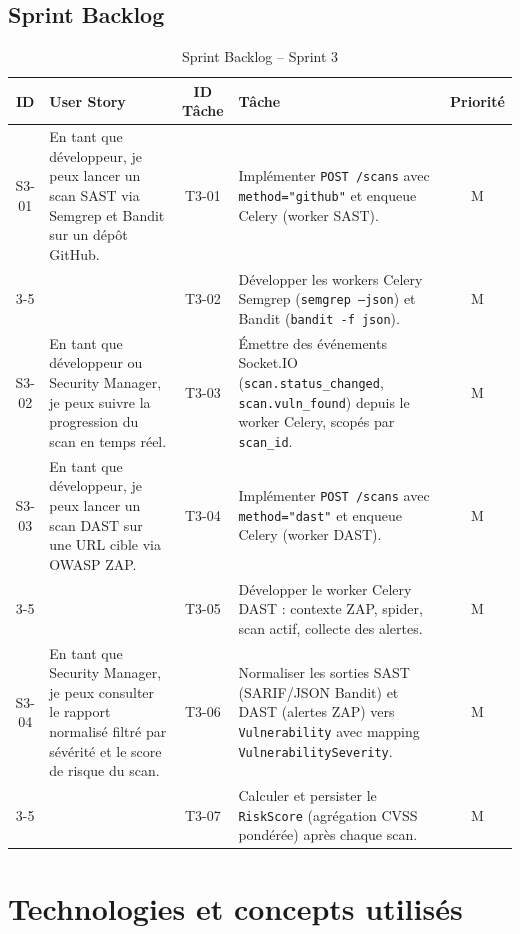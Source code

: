 \subsection{Sprint Backlog}
\begin{table}[H]
\centering
\caption{Sprint Backlog -- Sprint 3}
\label{tab:sprint3-backlog}
\small
\renewcommand{\arraystretch}{1.3}
\begin{tabularx}{\textwidth}{c X c X c}
\hline
\rowcolor{gray!15}
\textbf{ID} & \textbf{User Story} & \textbf{ID Tâche} & \textbf{Tâche} & \textbf{Priorité} \\
\hline
S3-01 & En tant que développeur, je peux lancer un scan SAST via Semgrep et Bandit sur un dépôt GitHub.
  & T3-01 & Implémenter \texttt{POST /scans} avec \texttt{method="github"} et enqueue Celery (worker SAST). & M \\
\cline{3-5}
  & & T3-02 & Développer les workers Celery Semgrep (\texttt{semgrep --json}) et Bandit (\texttt{bandit -f json}). & M \\
\hline
S3-02 & En tant que développeur ou Security Manager, je peux suivre la progression du scan en temps réel.
  & T3-03 & Émettre des événements Socket.IO (\texttt{scan.status\_changed}, \texttt{scan.vuln\_found}) depuis le worker Celery, scopés par \texttt{scan\_id}. & M \\
\hline
S3-03 & En tant que développeur, je peux lancer un scan DAST sur une URL cible via OWASP ZAP.
  & T3-04 & Implémenter \texttt{POST /scans} avec \texttt{method="dast"} et enqueue Celery (worker DAST). & M \\
\cline{3-5}
  & & T3-05 & Développer le worker Celery DAST : contexte ZAP, spider, scan actif, collecte des alertes. & M \\
\hline
S3-04 & En tant que Security Manager, je peux consulter le rapport normalisé filtré par sévérité et le score de risque du scan.
  & T3-06 & Normaliser les sorties SAST (SARIF/JSON Bandit) et DAST (alertes ZAP) vers \texttt{Vulnerability} avec mapping \texttt{VulnerabilitySeverity}. & M \\
\cline{3-5}
  & & T3-07 & Calculer et persister le \texttt{RiskScore} (agrégation CVSS pondérée) après chaque scan. & M \\
\hline
\end{tabularx}
\end{table}

\section{Technologies et concepts utilisés}

